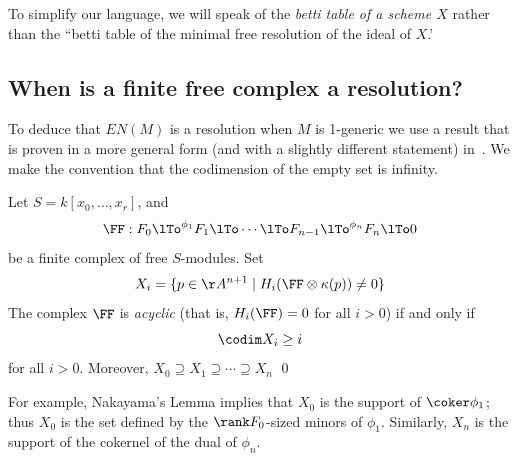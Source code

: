 
 To simplify our language, we will speak of the \emph{betti table of a scheme $X$} rather than the ``betti table of the minimal free resolution of the ideal of $X$.'

\subsection{When is a finite free complex a resolution?}
To deduce that $EN(M)$ is a resolution when $M$ is 1-generic we use
a result that is proven in a more general form (and with a slightly different statement) 
in~\cite[Theorem 20.9]{Eisenbud1995}. We make the convention
that the codimension of the empty set is infinity.

\begin{theorem}\label{WMACE}
 Let $S = k[x_0,\dots, x_r]$, and
 $$ 
\FF:  F_0\lTo^{\phi_1}F_1 \lTo \cdots \lTo F_{n-1}\lTo^{\phi_n} F_n\lTo 0
 $$
be a finite complex of free $S$-modules. Set
$$
X_i = \{p\in \AA^{n+1} \mid  H_i(\FF \otimes \kappa(p)) \neq 0\}
$$
The complex $\FF$ is \emph{acyclic} (that is, $H_i(\FF) = 0$ for all $i>0$) if and only if
$$
\codim X_i \geq i
$$
for all $i>0$. Moreover, $X_{0}\supseteq X_{1}\supseteq \cdots \supseteq X_{n}$
\qed
\end{theorem}

For example, Nakayama's Lemma implies that $X_{0}$ is the support of $\coker \phi_{1}$; thus $X_{0}$ is the set defined by the $\rank F_{0}$-sized minors of $\phi_{1}$. Similarly, 
$X_{n}$ is the support of the cokernel of the dual of $\phi_{n}$. 

